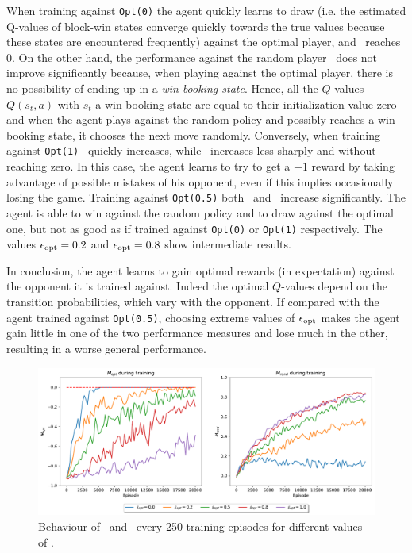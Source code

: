 \documentclass[10pt]{IEEEtran}
\begin{document}
When training against \texttt{Opt(0)} the agent quickly learns to draw (i.e. the estimated Q-values of block-win states converge quickly towards the true values because these states are encountered frequently) against the optimal player, and \mopt\  reaches 0. On the other hand, the performance against the random player \mrand\  does not improve significantly because, when playing against the optimal player, there is no possibility of ending up in a \emph{win-booking state}. Hence, all the $Q$-values $Q(s_t, a)$ with $s_t$ a win-booking state are equal to their initialization value zero and when the agent plays against the random policy and possibly reaches a win-booking state, it chooses the next move randomly. 
Conversely, when training against \texttt{Opt(1)} \mrand\  quickly increases, while \mopt\  increases less sharply and without reaching zero. In this case, the agent learns to try to get a $+1$ reward by taking advantage of possible mistakes of his opponent, even if this implies occasionally losing the game. 
Training against \texttt{Opt(0.5)} both \mopt\  and \mrand\  increase significantly. The agent is able to win against the random policy and to draw against the optimal one, but not as good as if trained against \texttt{Opt(0)} or \texttt{Opt(1)} respectively. The values $\epsilon_{\text{opt}} = 0.2$ and $\epsilon_{\text{opt}} = 0.8$ show intermediate results. 

In conclusion, the agent learns to gain optimal rewards (in expectation) against the opponent it is trained against. Indeed the optimal $Q$-values depend on the transition probabilities, which vary with the opponent. If compared with the agent trained against \texttt{Opt(0.5)}, choosing extreme values of $\epsilon_{\text{opt}}$ makes the agent gain little in one of the two performance measures and lose much in the other, resulting in a worse general performance.

\begin{figure}[h]
    \centering
    \includegraphics[width=\linewidth]{code/figures/performance_epsilon_opt.pdf}
    \caption{Behaviour of \mopt\  and \mrand\  every 250 training episodes for different values of \eopt.}
    \label{plot_question4}
\end{figure}
\end{document}
